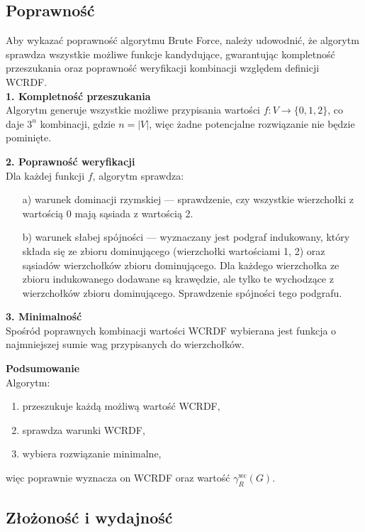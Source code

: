 \subsection{Poprawność}
\label{subsec:bf_poprawnosc}

Aby wykazać poprawność algorytmu Brute Force, należy udowodnić, że algorytm sprawdza wszystkie możliwe funkcje kandydujące, gwarantując kompletność przeszukania oraz poprawność weryfikacji kombinacji względem definicji WCRDF.\\

\textbf{1. Kompletność przeszukania}\\
Algorytm generuje wszystkie możliwe przypisania wartości $f: V \to \{0,1,2\}$, co daje $3^n$ kombinacji, gdzie $n = |V|$, więc żadne potencjalne rozwiązanie nie będzie pominięte.

\textbf{2. Poprawność weryfikacji}\\
Dla każdej funkcji $f$, algorytm sprawdza:

\begin{itemize}
    \item[a)] warunek dominacji rzymskiej — sprawdzenie, czy wszystkie wierzchołki z wartością 0 mają sąsiada z wartością 2.
    
    \item[b)] warunek słabej spójności — wyznaczany jest podgraf indukowany, który składa się ze zbioru dominującego (wierzchołki wartościami {1, 2}) oraz sąsiadów wierzchołków zbioru dominującego. Dla każdego wierzchołka ze zbioru indukowanego dodawane są krawędzie, ale tylko te wychodzące z wierzchołków zbioru dominującego. Sprawdzenie spójności tego podgrafu.
\end{itemize}

\textbf{3. Minimalność}\\
Spośród poprawnych kombinacji wartości WCRDF wybierana jest funkcja o najmniejszej sumie wag przypisanych do wierzchołków.

\textbf{Podsumowanie}\\
Algorytm:
\begin{enumerate}
    \item przeszukuje każdą możliwą wartość WCRDF,
    \item sprawdza warunki WCRDF,
    \item wybiera rozwiązanie minimalne,
\end{enumerate}
więc poprawnie wyznacza on WCRDF oraz wartość $\gamma^{\text{wc}}_R(G)$.

\subsection{Złożoność i wydajność}

